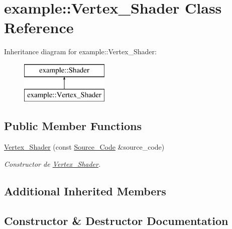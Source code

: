\hypertarget{classexample_1_1_vertex___shader}{}\section{example\+::Vertex\+\_\+\+Shader Class Reference}
\label{classexample_1_1_vertex___shader}
Inheritance diagram for example\+::Vertex\+\_\+\+Shader\+:\begin{figure}[H]
\begin{center}
\leavevmode
\includegraphics[height=2.000000cm]{classexample_1_1_vertex___shader}
\end{center}
\end{figure}
\subsection*{Public Member Functions}
\begin{DoxyCompactItemize}
\item 
\mbox{\hyperlink{classexample_1_1_vertex___shader_a4c9c616101a9c97e61a2e5c1563cdda7}{Vertex\+\_\+\+Shader}} (const \mbox{\hyperlink{classexample_1_1_shader_1_1_source___code}{Source\+\_\+\+Code}} \&source\+\_\+code)
\begin{DoxyCompactList}\small\item\em Constructor de \mbox{\hyperlink{classexample_1_1_vertex___shader}{Vertex\+\_\+\+Shader}}. \end{DoxyCompactList}\end{DoxyCompactItemize}
\subsection*{Additional Inherited Members}


\subsection{Constructor \& Destructor Documentation}
\mbox{\label{classexample_1_1_vertex___shader_a4c9c616101a9c97e61a2e5c1563cdda7}} 
